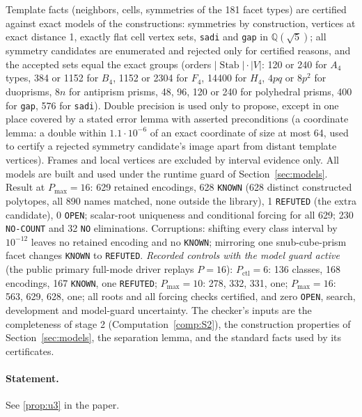 \documentclass[11pt]{article}
\theoremstyle{definition}
\theoremstyle{remark}
\newcommand{\Q}{\mathbb{Q}}
\newcommand{\Stab}{\operatorname{Stab}}
\begin{document}
Template facts (neighbors, cells, symmetries of the 181 facet types) are
certified against exact models of the constructions: symmetries by
construction, vertices at exact distance 1, exactly flat cell vertex sets,
\texttt{sadi} and \texttt{gap} in $\Q(\sqrt5)$; all symmetry candidates are
enumerated and rejected only for certified reasons, and the accepted sets
equal the exact groups (orders $|\Stab|\cdot|V|$: 120 or 240 for $A_4$
types, 384 or 1152 for $B_4$, 1152 or 2304 for $F_4$, 14400 for $H_4$,
$4pq$ or $8p^2$ for duoprisms, $8n$ for antiprism prisms, 48, 96, 120 or
240 for polyhedral prisms, 400 for \texttt{gap}, 576 for \texttt{sadi}).
Double precision is used only to propose, except in one place covered by
a stated error lemma with asserted preconditions (a coordinate lemma: a
double within $1.1\cdot10^{-6}$ of an exact coordinate of size at most 64,
used to certify a rejected symmetry candidate's image apart from distant
template vertices). Frames and local vertices are excluded by interval
evidence only.
All models are built and used under the runtime guard of
Section~\ref{sec:models}. Result at $P_{\max}=16$: 629
retained encodings, 628 \texttt{KNOWN} (628 distinct constructed polytopes, all 890 names
matched, none outside the library), 1 \texttt{REFUTED} (the extra
candidate), 0 \texttt{OPEN}; scalar-root uniqueness and conditional
forcing for all 629; 230
\texttt{NO-COUNT} and 32 \texttt{NO} eliminations. Corruptions: shifting every
class interval by $10^{-12}$ leaves no retained encoding and no \texttt{KNOWN};
mirroring one snub-cube-prism facet changes \texttt{KNOWN} to
\texttt{REFUTED}. \emph{Recorded controls with the model guard active} (the public
primary full-mode driver replays $P=16$): $P_{\mathrm{ctl}}=6$: 136 classes,
168 encodings, 167 \texttt{KNOWN}, one \texttt{REFUTED}; $P_{\max}=10$:
278, 332, 331, one; $P_{\max}=16$: 563, 629, 628, one; all roots and all
forcing checks certified, and zero \texttt{OPEN}, search, development and
model-guard uncertainty. The checker's inputs are the
completeness of stage 2 (Computation~\ref{comp:S2}), the construction
properties of Section~\ref{sec:models}, the separation lemma, and the
standard facts used by its certificates.

\setcounter{theorem}{13}
\paragraph{Statement.} See \ref{prop:u3} in the paper.
\end{document}
